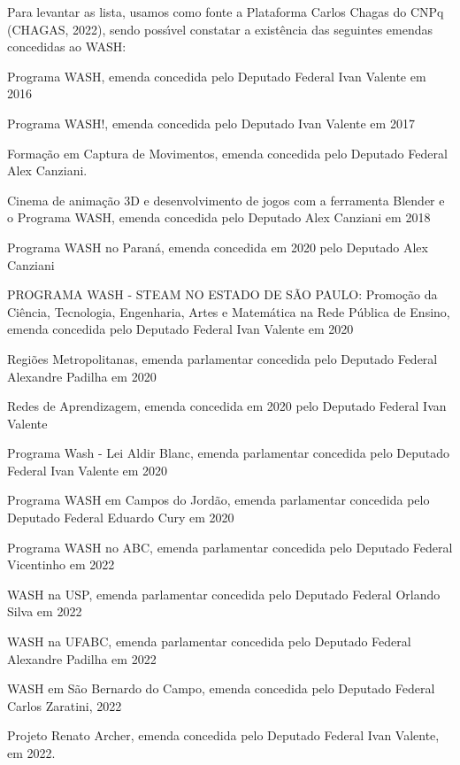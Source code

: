 \documentclass[
12pt,		%
openright,	%
twoside,  %
a4paper,			%
chapter=TITLE,		%
english,			%
french,				%
spanish,			%
brazil				%
]{USPSC-classe/USPSC}
\begin{document}
Para levantar as lista, usamos como fonte a Plataforma Carlos Chagas do CNPq (CHAGAS, 2022), sendo poss\'{\i}vel constatar a exist\^encia das seguintes emendas concedidas ao WASH:









\begin{alineas}
\item \textquotedbl Programa WASH, emenda concedida pelo Deputado Federal Ivan Valente em 2016
\item \textquotedbl Programa WASH!\textquotedbl , emenda concedida pelo Deputado Ivan Valente em 2017
\item \textquotedbl Forma\c{c}\~ao em Captura de Movimentos\textquotedbl , emenda concedida pelo Deputado Federal Alex Canziani.
\item \textquotedbl Cinema de anima\c{c}\~ao 3D e desenvolvimento de jogos com a ferramenta Blender e o Programa WASH\textquotedbl , emenda concedida pelo Deputado Alex Canziani em 2018
\item \textquotedbl Programa WASH no Paran\'a\textquotedbl , emenda concedida em 2020 pelo Deputado Alex Canziani
\item \textquotedbl PROGRAMA WASH - STEAM NO ESTADO DE S\~AO PAULO: Promo\c{c}\~ao da Ci\^encia, 
Tecnologia, Engenharia, Artes  e Matem\'atica na Rede P\'ublica de Ensino\textquotedbl , emenda concedida pelo Deputado Federal Ivan Valente em 2020

\item \textquotedbl Regi\~oes Metropolitanas\textquotedbl , emenda parlamentar concedida pelo Deputado Federal Alexandre Padilha em 2020
\item \textquotedbl Redes de Aprendizagem\textquotedbl , emenda concedida em 2020 pelo Deputado Federal Ivan Valente
\item \textquotedbl Programa Wash - Lei Aldir Blanc\textquotedbl , emenda parlamentar concedida pelo Deputado Federal  Ivan Valente em 2020
\item \textquotedbl Programa WASH em Campos do Jord\~ao\textquotedbl , emenda parlamentar concedida pelo Deputado Federal Eduardo Cury em 2020
\item \textquotedbl Programa WASH no ABC\textquotedbl , emenda parlamentar concedida pelo Deputado Federal Vicentinho em 2022
\item \textquotedbl WASH na USP\textquotedbl , emenda parlamentar concedida pelo Deputado Federal Orlando Silva em 2022
\item \textquotedbl WASH na UFABC\textquotedbl , emenda parlamentar concedida pelo Deputado Federal Alexandre Padilha em 2022
\item \textquotedbl WASH em S\~ao Bernardo do Campo\textquotedbl , emenda concedida pelo Deputado Federal Carlos Zaratini, 2022
\item \textquotedbl Projeto Renato Archer\textquotedbl , emenda concedida pelo Deputado Federal Ivan Valente, em 2022.
\end{alineas}
\end{document}
